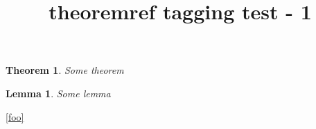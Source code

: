 \documentclass{article}
\title{theoremref tagging test - 1}
\newtheorem{theorem}{Theorem}
\newtheorem{lemma}{Lemma}
\begin{document}
\begin{theorem}
Some theorem
\end{theorem}
\begin{lemma}
Some lemma
\end{lemma}

\ref{foo}


\end{document}
